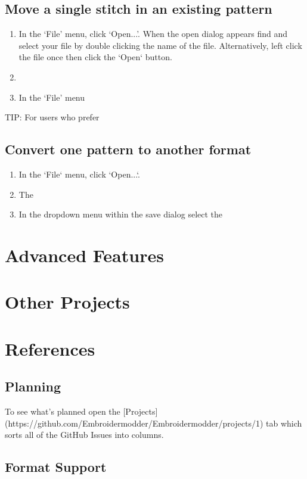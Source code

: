 \documentclass[a4paper, 11pt]{report}
\begin{document}
\subsection{Move a single stitch in an existing pattern}

\begin{enumerate}
\item In the `File' menu, click `Open...'. When the open dialog appears find
  and select your file by double clicking the name of the file. Alternatively,
  left click the file once then click the `Open` button.
\item
\item In the `File' menu
\end{enumerate}

TIP: For users who prefer

\subsection{Convert one pattern to another format}

\begin{enumerate}
\item In the `File` menu, click `Open...`.
\item The 
\item In the dropdown menu within the save dialog select the 
\end{enumerate}

\section{Advanced Features}

\section{Other Projects}


\section{References}


\subsection{Planning}

To see what's planned open the [Projects](https://github.com/Embroidermodder/Embroidermodder/projects/1) tab which sorts all of the GitHub Issues into columns.

\subsection{Format Support}
\end{document}
